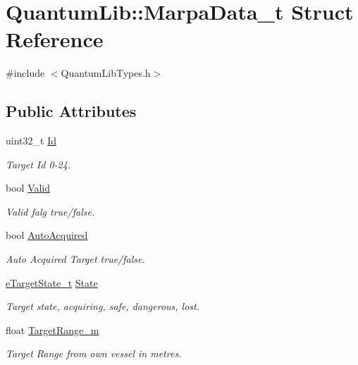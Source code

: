\hypertarget{struct_quantum_lib_1_1_marpa_data__t}{}\section{Quantum\+Lib\+:\+:Marpa\+Data\+\_\+t Struct Reference}
\label{struct_quantum_lib_1_1_marpa_data__t}


{\ttfamily \#include $<$Quantum\+Lib\+Types.\+h$>$}

\subsection*{Public Attributes}
\begin{DoxyCompactItemize}
\item 
uint32\+\_\+t \mbox{\hyperlink{struct_quantum_lib_1_1_marpa_data__t_a0cce669685dd1f592f3e3f49edd04cac}{Id}}
\begin{DoxyCompactList}\small\item\em Target Id 0-\/24. \end{DoxyCompactList}\item 
bool \mbox{\hyperlink{struct_quantum_lib_1_1_marpa_data__t_a9a4ca2c1d1339b879ae1e15e4cb29883}{Valid}}
\begin{DoxyCompactList}\small\item\em Valid falg true/false. \end{DoxyCompactList}\item 
bool \mbox{\hyperlink{struct_quantum_lib_1_1_marpa_data__t_aff59bc5eced1f3368a7bde234b0fd79b}{Auto\+Acquired}}
\begin{DoxyCompactList}\small\item\em Auto Acquired Target true/false. \end{DoxyCompactList}\item 
\mbox{\hyperlink{namespace_quantum_lib_ab53e7395955c4dfb725e2ff41809ca9e}{e\+Target\+State\+\_\+t}} \mbox{\hyperlink{struct_quantum_lib_1_1_marpa_data__t_af9e31e0f8f5b894859b08e9e7b36de18}{State}}
\begin{DoxyCompactList}\small\item\em Target state, acquiring, safe, dangerous, lost. \end{DoxyCompactList}\item 
float \mbox{\hyperlink{struct_quantum_lib_1_1_marpa_data__t_a6b6961c34e9aabbbacca9ee2da75efaf}{Target\+Range\+\_\+m}}
\begin{DoxyCompactList}\small\item\em Target Range from own vessel in metres. \end{DoxyCompactList}\item 

\end{DoxyCompactItemize}
